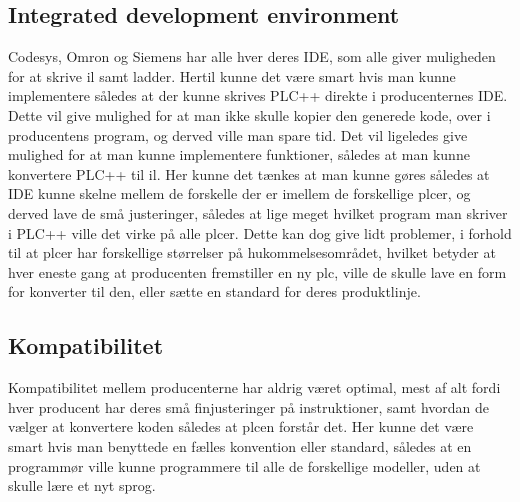 \subsection*{Integrated development environment}
Codesys, Omron og Siemens har alle hver deres IDE, som alle giver muligheden for at skrive \gls{il} samt ladder.
Hertil kunne det være smart hvis man kunne implementere således at der kunne skrives PLC++ direkte i producenternes IDE. Dette vil give mulighed for at man ikke skulle kopier den generede kode, over i producentens program, og derved ville man spare tid.
Det vil ligeledes give mulighed for at man kunne implementere funktioner, således at man kunne konvertere PLC++ til \gls{il}.
Her kunne det tænkes at man kunne gøres således at IDE kunne skelne mellem de forskelle der er imellem de forskellige \gls{plc}er, og derved lave de små justeringer, således at lige meget hvilket program man skriver i PLC++ ville det virke på alle \gls{plc}er.
Dette kan dog give lidt problemer, i forhold til at \gls{plc}er har forskellige størrelser på hukommelsesområdet, hvilket betyder at hver eneste gang at producenten fremstiller en ny \gls{plc}, ville de skulle lave en form for konverter til den, eller sætte en standard for deres produktlinje.

\subsection*{Kompatibilitet}
Kompatibilitet mellem producenterne har aldrig været optimal, mest af alt fordi hver producent har deres små finjusteringer på instruktioner, samt hvordan de vælger at konvertere koden således at \gls{plc}en forstår det.
Her kunne det være smart hvis man benyttede en fælles konvention eller standard, således at en programmør ville kunne programmere til alle de forskellige modeller, uden at skulle lære et nyt sprog.





